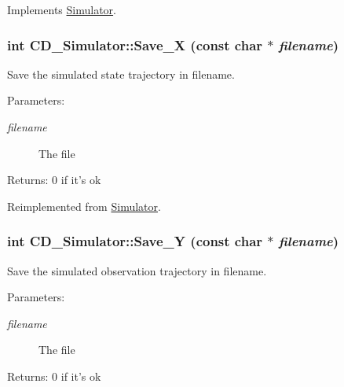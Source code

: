 Implements \hyperlink{class_simulator_75b0dfb5b0b88346ecb9f7da4fbd91f1}{Simulator}.\hypertarget{class_c_d___simulator_7d9d7bb805654ee7ee1f2235364bc19e}{
\subsubsection[{Save\_\-X}]{\setlength{\rightskip}{0pt plus 5cm}int CD\_\-Simulator::Save\_\-X (const char $\ast$ {\em filename})}}
\label{class_c_d___simulator_7d9d7bb805654ee7ee1f2235364bc19e}


Save the simulated state trajectory in filename. 

\begin{Desc}
\item[Parameters:]
\begin{description}
\item[{\em filename}]The file\end{description}
\end{Desc}
\begin{Desc}
\item[Returns:]0 if it's ok \end{Desc}


Reimplemented from \hyperlink{class_simulator_47da05750f6f78051dcdecb5da666653}{Simulator}.\hypertarget{class_c_d___simulator_f9d3fb4fbc4b77afd81fb8b67e003cee}{
\subsubsection[{Save\_\-Y}]{\setlength{\rightskip}{0pt plus 5cm}int CD\_\-Simulator::Save\_\-Y (const char $\ast$ {\em filename})}}
\label{class_c_d___simulator_f9d3fb4fbc4b77afd81fb8b67e003cee}


Save the simulated observation trajectory in filename. 

\begin{Desc}
\item[Parameters:]
\begin{description}
\item[{\em filename}]The file\end{description}
\end{Desc}
\begin{Desc}
\item[Returns:]0 if it's ok \end{Desc}


